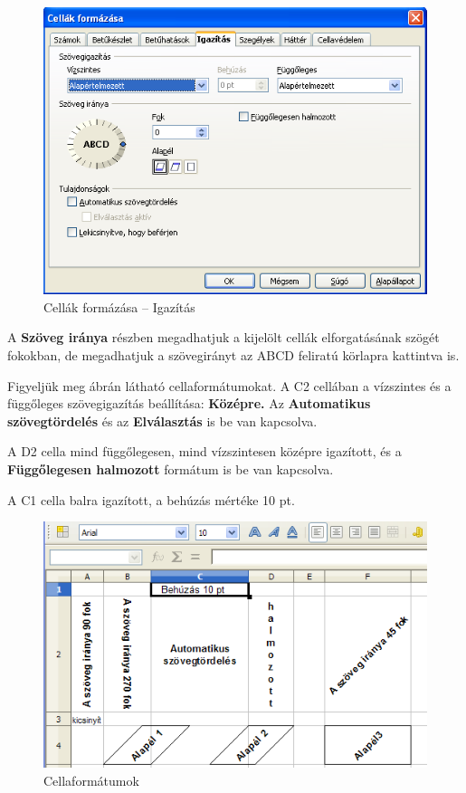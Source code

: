 \begin{figure}[!h]
\begin{center}
\includegraphics[width=12.97cm]{oocalcv1-img12.png}
\caption{Cellák formázása --  Igazítás}\label{CellákIgazítása}
\end{center}
\end{figure}

A \textbf{Szöveg iránya} részben megadhatjuk a kijelölt cellák
elforgatásának szögét fokokban, de megadhatjuk a
szövegirányt az ABCD feliratú körlapra kattintva is.

Figyeljük meg  ábrán látható cellaformátumokat.
A C2 cellában a vízszintes és a függőleges szövegigazítás
beállítása: \textbf{Középre.} Az \textbf{Automatikus
szövegtördelés} és az \textbf{Elválasztás} is be van
kapcsolva.

A D2 cella mind függőlegesen, mind vízszintesen középre
igazított, és a \textbf{Függőlegesen halmozott} formátum is
be van kapcsolva. 

A C1 cella balra igazított, a behúzás mértéke 10 pt.

\begin{figure}[!h]
\begin{center}
\includegraphics[width=12.439cm]{oocalcv1-img13.png}
\caption{Cellaformátumok}\label{Cellaformátumok}
\end{center}
\end{figure}

